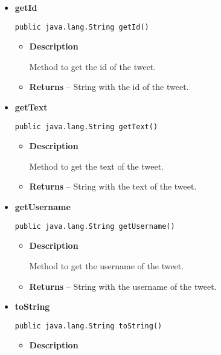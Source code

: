 {{{{{{{\begin{itemize}
{\begin{itemize}
{Method to get the hash of the tweet.
}
\item{{\bf  Returns} -- 
String with the hash of the tweet. 
}%
\end{itemize}
}%
\item{ 
\hypertarget{com.jmorenov.tweetsccore.twitter.Tweet.getId()}{{\bf  getId}\\}
\begin{lstlisting}[frame=none]
public java.lang.String getId()\end{lstlisting} %
\begin{itemize}
\item{
{\bf  Description}

Method to get the id of the tweet.
}
\item{{\bf  Returns} -- 
String with the id of the tweet. 
}%
\end{itemize}
}%
\item{ 
\hypertarget{com.jmorenov.tweetsccore.twitter.Tweet.getText()}{{\bf  getText}\\}
\begin{lstlisting}[frame=none]
public java.lang.String getText()\end{lstlisting} %
\begin{itemize}
\item{
{\bf  Description}

Method to get the text of the tweet.
}
\item{{\bf  Returns} -- 
String with the text of the tweet. 
}%
\end{itemize}
}%
\item{ 
\hypertarget{com.jmorenov.tweetsccore.twitter.Tweet.getUsername()}{{\bf  getUsername}\\}
\begin{lstlisting}[frame=none]
public java.lang.String getUsername()\end{lstlisting} %
\begin{itemize}
\item{
{\bf  Description}

Method to get the username of the tweet.
}
\item{{\bf  Returns} -- 
String with the username of the tweet. 
}%
\end{itemize}
}%
\item{ 
\hypertarget{com.jmorenov.tweetsccore.twitter.Tweet.toString()}{{\bf  toString}\\}
\begin{lstlisting}[frame=none]
public java.lang.String toString()\end{lstlisting} %
\begin{itemize}
\item{
{\bf  Description}

}
\end{itemize}}
\end{itemize}}}}}}}}
